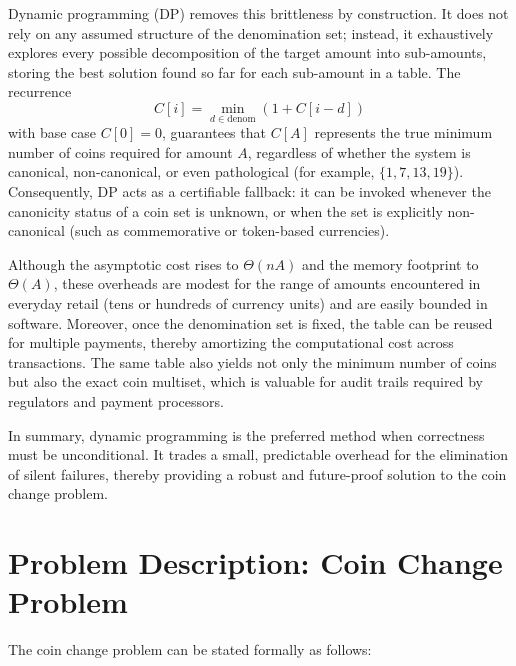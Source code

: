 \documentclass[12pt,a4paper]{report}
\begin{document}
Dynamic programming (DP) removes this brittleness by construction. It does not rely on any assumed structure of the denomination set; instead, it exhaustively explores every possible decomposition of the target amount into sub-amounts, storing the best solution found so far for each sub-amount in a table. The recurrence
\[
C[i] = \min_{d \in \text{denom}} (1 + C[i - d])
\]
with base case $C[0] = 0$, guarantees that $C[A]$ represents the true minimum number of coins required for amount $A$, regardless of whether the system is canonical, non-canonical, or even pathological (for example, $\{1, 7, 13, 19\}$). Consequently, DP acts as a certifiable fallback: it can be invoked whenever the canonicity status of a coin set is unknown, or when the set is explicitly non-canonical (such as commemorative or token-based currencies).

Although the asymptotic cost rises to $\Theta(nA)$ and the memory footprint to $\Theta(A)$, these overheads are modest for the range of amounts encountered in everyday retail (tens or hundreds of currency units) and are easily bounded in software. Moreover, once the denomination set is fixed, the table can be reused for multiple payments, thereby amortizing the computational cost across transactions. The same table also yields not only the minimum number of coins but also the exact coin multiset, which is valuable for audit trails required by regulators and payment processors.

In summary, dynamic programming is the preferred method when correctness must be unconditional. It trades a small, predictable overhead for the elimination of silent failures, thereby providing a robust and future-proof solution to the coin change problem.

\section{Problem Description: Coin Change Problem}

The coin change problem can be stated formally as follows:
\end{document}
